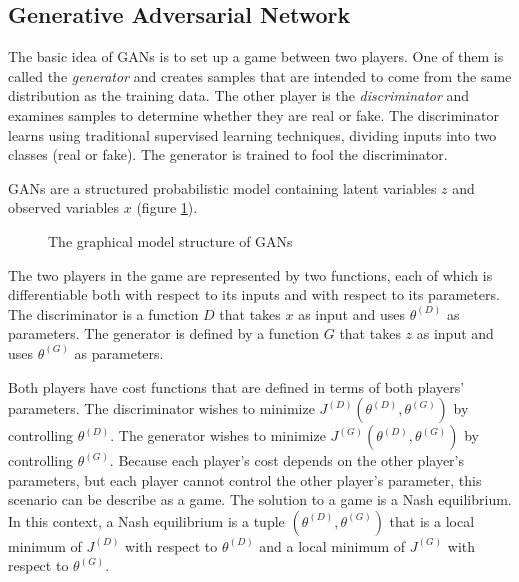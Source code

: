 \documentclass[12pt]{report}
\begin{document}
\subsection{Generative Adversarial Network}
\label{sec:back:gan}


The basic idea of GANs \cite{noauthor_gan_2017, goodfellow_generative_2016, goodfellow_generative_2014, goodfellow_nips_2017} is to set up a game between two players.
One of them is called the \textit{generator} and creates samples that are intended to come from the same distribution as the training data.
The other player is the \textit{discriminator} and examines samples to determine whether they are real or fake.
The discriminator learns using traditional supervised learning techniques, dividing inputs into two classes (real or fake).
The generator is trained to fool the discriminator.

GANs are a structured probabilistic model containing latent variables $z$ and observed variables $x$ (figure \ref{fig:gan-latent-space}).

\begin{figure}[htbp]
\begin{center}
\caption{The graphical model structure of GANs}
\label{fig:gan-latent-space}
\end{center}
\end{figure}

The two players in the game are represented by two functions, each of which is differentiable both with respect to its inputs and with respect to its parameters.
The discriminator is a function $D$ that takes $x$ as input and uses $\theta^{(D)}$ as parameters.
The generator is defined by a function $G$ that takes $z$ as input and uses $\theta^{(G)}$ as parameters.

Both players have cost functions that are defined in terms of both players’ parameters.
The discriminator wishes to minimize $J^{(D)} (\theta^{(D)}, \theta^{(G)})$ by controlling $\theta^{(D)}$.
The generator wishes to minimize $J^{(G)} (\theta^{(D)}, \theta^{(G)})$ by controlling $\theta^{(G)}$.
Because each player’s cost depends on the other player’s parameters, but each player cannot control the other player’s parameter, this scenario can be describe as a game.
The solution to a game is a Nash equilibrium.
In this context, a Nash equilibrium is a tuple $(\theta^{(D)}, \theta^{(G)})$ that is a local minimum of $J^{(D)}$ with respect to $\theta^{(D)}$ and a local minimum of $J^{(G)}$ with respect to $\theta^{(G)}$.
\end{document}
